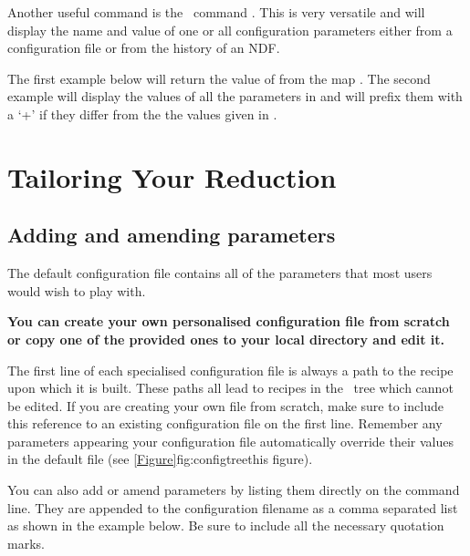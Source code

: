 \documentclass[11pt,oneside,chapters]{starlink}
\begin{document}
\begin{terminalv}
\end{terminalv}
Another useful command is the \Kappa\ command \configecho.
This is very versatile and will display the name and value of one or
all configuration parameters either from a configuration file or from
the history of an NDF.

The first example below will return the value of  from
the map . The second example will display the values of all
the parameters in  and will prefix them with a `+' if they
differ from the the values given in .

\begin{terminalv}
\end{terminalv}


\clearpage
\chapter{Tailoring Your Reduction}
\label{sec:tweak}


\section{Adding and amending parameters}
The default configuration file  contains all of
the parameters that most users would wish to play with.

\textbf{You can create your own personalised configuration file from
scratch or copy one of the provided ones to your local directory and
edit it.}

The first line of each specialised configuration file is always a path
to the recipe upon which it is built. These paths all lead to
recipes in the \starlink\ tree which cannot be edited. If you are
creating your own file from scratch, make sure to include this
reference to an existing configuration file on the first line.
Remember any parameters appearing your configuration file
automatically override their values in the default file (see
\cref{Figure}{fig:configtree}{this figure}).

You can also add or amend parameters by listing them directly on the
command line. They are appended to the configuration filename as a
comma separated list as shown in the example below. Be sure to include
all the necessary quotation marks.
\end{document}
